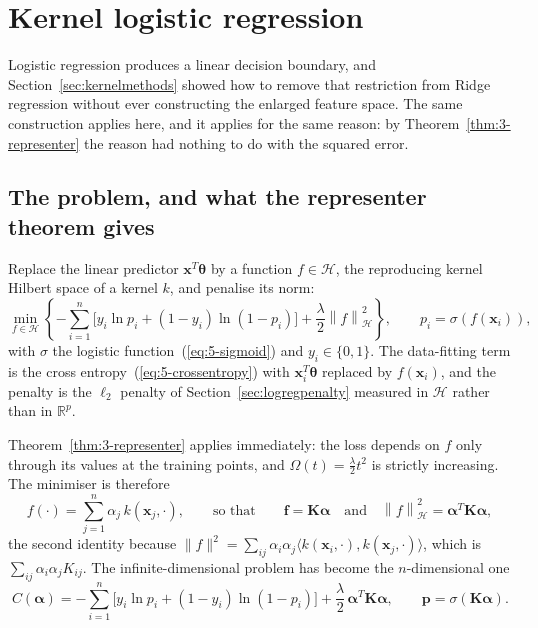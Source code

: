 \section{Kernel logistic regression}
\label{sec:kernellogreg}

Logistic regression produces a linear decision boundary, and
Section~\ref{sec:kernelmethods} showed how to remove that restriction from
Ridge regression without ever constructing the enlarged feature space.  The
same construction applies here, and it applies for the same reason: by
Theorem~\ref{thm:3-representer} the reason had nothing to do with the squared
error.

\subsection{The problem, and what the representer theorem gives}
\label{sec:klogregsetup}

Replace the linear predictor $\bm{x}^{T}\bm{\theta}$ by a function
$f\in\mathcal{H}$, the reproducing kernel Hilbert space of a kernel $k$, and
penalise its norm:
\begin{equation}
  \min_{f\in\mathcal{H}}\left\{
    -\sum_{i=1}^{n}\Big[y_i\ln p_i + (1-y_i)\ln(1-p_i)\Big]
    + \frac{\lambda}{2}\left\|f\right\|_{\mathcal{H}}^{2}\right\},
  \qquad
  p_i = \sigma\!\left(f(\bm{x}_i)\right),
  \label{eq:5-klogregproblem}
\end{equation}
with $\sigma$ the logistic function~(\ref{eq:5-sigmoid}) and $y_i\in\{0,1\}$.
The data-fitting term is the cross entropy~(\ref{eq:5-crossentropy}) with
$\bm{x}_i^{T}\bm{\theta}$ replaced by $f(\bm{x}_i)$, and the penalty is the
$\ell_2$ penalty of Section~\ref{sec:logregpenalty} measured in $\mathcal{H}$
rather than in $\mathbb{R}^{p}$.

Theorem~\ref{thm:3-representer} applies immediately: the loss depends on $f$
only through its values at the training points, and
$\Omega(t)=\tfrac{\lambda}{2}t^{2}$ is strictly increasing.  The minimiser is
therefore
\begin{equation}
  f(\cdot) = \sum_{j=1}^{n}\alpha_j\,k\!\left(\bm{x}_j,\cdot\right),
  \qquad\text{so that}\qquad
  \bm{f} = \bm{K}\bm{\alpha}
  \quad\text{and}\quad
  \left\|f\right\|_{\mathcal{H}}^{2}
   = \bm{\alpha}^{T}\bm{K}\bm{\alpha},
  \label{eq:5-krepresenter}
\end{equation}
the second identity because
$\|f\|^{2}=\sum_{ij}\alpha_i\alpha_j\langle k(\bm{x}_i,\cdot),
k(\bm{x}_j,\cdot)\rangle$, which is $\sum_{ij}\alpha_i\alpha_jK_{ij}$.  The
infinite-dimensional problem has become the $n$-dimensional one
\begin{equation}
  \boxed{\;
  C(\bm{\alpha}) =
    -\sum_{i=1}^{n}\Big[y_i\ln p_i+(1-y_i)\ln(1-p_i)\Big]
    + \frac{\lambda}{2}\,\bm{\alpha}^{T}\bm{K}\bm{\alpha},
  \qquad
  \bm{p} = \sigma\!\left(\bm{K}\bm{\alpha}\right). \;}
  \label{eq:5-kcost}
\end{equation}

